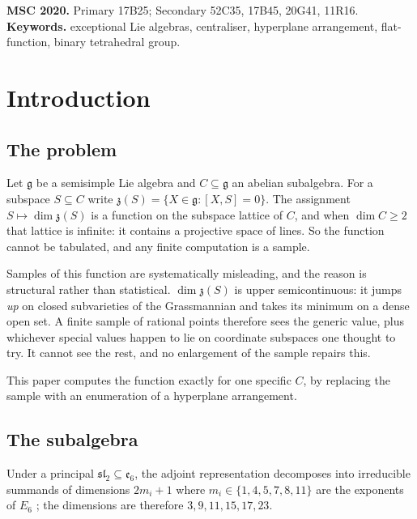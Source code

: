 \documentclass[11pt,a4paper]{article}
\theoremstyle{definition}
\theoremstyle{remark}
\newcommand{\g}{\mathfrak{g}}
\newcommand{\esix}{\mathfrak{e}_6}
\newcommand{\slt}{\mathfrak{sl}_2}
\newcommand{\z}{\mathfrak{z}}
\begin{document}
\medskip\noindent\small\textbf{MSC 2020.} Primary 17B25; Secondary 52C35, 17B45, 20G41, 11R16.\\
\textbf{Keywords.} exceptional Lie algebras, centraliser, hyperplane arrangement, flat-function, binary tetrahedral group.\normalsize


\section{Introduction}

\subsection{The problem}

Let $\g$ be a semisimple Lie algebra and $C\subseteq\g$ an abelian subalgebra. For a subspace
$S\subseteq C$ write $\z(S)=\{X\in\g:[X,S]=0\}$. The assignment $S\mapsto\dim\z(S)$ is a
function on the subspace lattice of $C$, and when $\dim C\ge2$ that lattice is infinite: it
contains a projective space of lines. So the function cannot be tabulated, and any finite
computation is a sample.

Samples of this function are systematically misleading, and the reason is structural rather
than statistical. $\dim\z(S)$ is upper semicontinuous: it jumps \emph{up} on closed subvarieties
of the Grassmannian and takes its minimum on a dense open set. A finite sample of rational
points therefore sees the generic value, plus whichever special values happen to lie on
coordinate subspaces one thought to try. It cannot see the rest, and no enlargement of the
sample repairs this.

This paper computes the function exactly for one specific $C$, by replacing the sample with an
enumeration of a hyperplane arrangement.

\subsection{The subalgebra}\label{sec:C}

Under a principal $\slt\subseteq\esix$, the adjoint representation decomposes into irreducible
summands of dimensions $2m_i+1$ where $m_i\in\{1,4,5,7,8,11\}$ are the exponents of $E_6$
\cite{Kostant}; the dimensions are therefore $3,9,11,15,17,23$.
\end{document}
